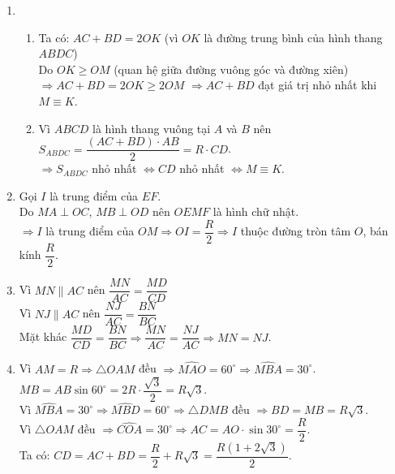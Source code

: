 \begin{bt}
{\begin{enumerate}[1.]
\begin{enumerate}
				$\Rightarrow$ đường tròn đường kính $CD$ tiếp xúc với $AB$ tại $O$.
			\end{enumerate}
			\item %
			\begin{enumerate}
				\item Ta có: $AC+BD=2OK$ (vì $OK$ là đường trung bình của hình thang $ABDC$)\\
				Do $OK \ge OM$ (quan hệ giữa đường vuông góc và đường xiên)\\
				$\Rightarrow AC+BD=2OK \ge 2OM$
				$\Rightarrow AC+BD$ đạt giá trị nhỏ nhất khi $M \equiv K$.
				\item Vì $ABCD$ là hình thang vuông tại $A$ và $B$ nên\\
				$S_{ABDC}=\dfrac{\left(AC+BD \right) \cdot AB }{2}=R \cdot CD$.\\
				$\Rightarrow S_{ABDC}$ nhỏ nhất $\Leftrightarrow CD$ nhỏ nhất $\Leftrightarrow M \equiv K$.
			\end{enumerate}
			\item Gọi $I$ là trung điểm của $EF$.\\
			Do $MA \perp OC$, $MB \perp OD$ nên $OEMF$ là hình chữ nhật.\\
			$\Rightarrow I$ là trung điểm của $OM \Rightarrow OI=\dfrac{R}{2} \Rightarrow I$ thuộc đường tròn tâm $O$, bán kính $\dfrac{R}{2}$.
			\item Vì $MN \parallel AC$ nên $\dfrac{MN}{AC}=\dfrac{MD}{CD}$\\
			Vì $NJ \parallel AC$ nên $\dfrac{NJ}{AC}=\dfrac{BN}{BC}$\\
			
			Mặt khác $\dfrac{MD}{CD}=\dfrac{BN}{BC} \Rightarrow \dfrac{MN}{AC}=\dfrac{NJ}{AC} \Rightarrow MN=NJ$.\\
			\item Vì $AM=R \Rightarrow \triangle OAM$ đều $\Rightarrow \widehat{MAO} =60^\circ \Rightarrow \widehat{MBA}=30^\circ$.\\
			$MB=AB \sin 60^\circ =2R \cdot \dfrac{\sqrt{3}}{2}=R \sqrt{3}$.\\
			Vì $\widehat{MBA}=30^\circ \Rightarrow \widehat{MBD}=60^\circ \Rightarrow \triangle DMB$ đều $\Rightarrow BD=MB=R \sqrt{3}$.\\
			Vì $\triangle OAM$ đều $\Rightarrow \widehat{COA}=30^\circ  \Rightarrow AC =AO \cdot \sin 30^\circ =\dfrac{R}{2}$.\\
			Ta có: $CD=AC+BD=\dfrac{R}{2}+R \sqrt{3}=\dfrac{R\left(1+2\sqrt{3} \right) }{2}$.
		\end{enumerate}
	}
\end{bt}

